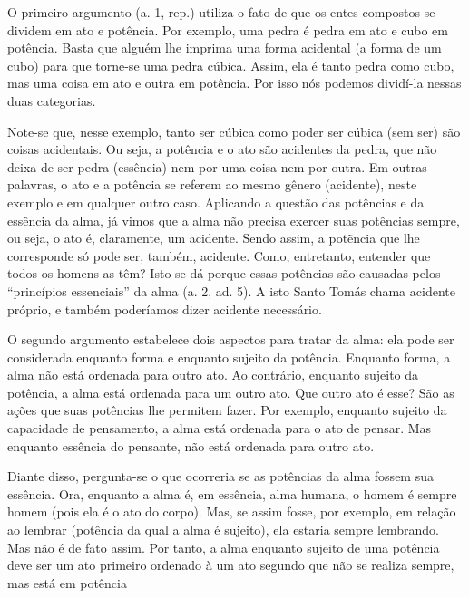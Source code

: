 \documentclass[
	article,			%
	12pt,				%
	oneside,			%
	a4paper,			%
	english,			%
	brazil,				%
	sumario=tradicional,
	doublespacing
	]{abntex2}
\begin{document}
O primeiro argumento (a. 1, rep.) utiliza o fato de que os entes compostos se dividem em ato e potência. Por exemplo, uma pedra é pedra em ato e cubo em potência. Basta que alguém lhe imprima uma forma acidental (a forma de um cubo) para que torne-se uma pedra cúbica. Assim, ela é tanto pedra como cubo, mas uma coisa em ato e outra em potência. Por isso nós podemos dividí-la nessas duas categorias.

Note-se que, nesse exemplo, tanto ser cúbica como poder ser cúbica (sem ser) são coisas acidentais. Ou seja, a potência e o ato são acidentes da pedra, que não deixa de ser pedra (essência) nem por uma coisa nem por outra. Em outras palavras, o ato e a potência se referem ao mesmo gênero (acidente), neste exemplo e em qualquer outro caso.
Aplicando a questão das potências e da essência da alma\label{potenciasEEssenscia}, já vimos que a alma não precisa exercer suas potências sempre, ou seja, o ato é, claramente, um acidente. Sendo assim, a potẽncia que lhe corresponde só pode ser, também, acidente. Como, entretanto, entender que todos os homens as têm? Isto se dá porque essas potências são causadas pelos ``princípios essenciais'' da alma (a. 2, ad. 5). A isto Santo Tomás chama acidente próprio, e também poderíamos dizer acidente necessário.

O segundo argumento estabelece dois aspectos para tratar da alma: ela pode ser considerada enquanto forma e enquanto sujeito da potência. Enquanto forma, a alma não está ordenada para outro ato. Ao contrário, enquanto sujeito da potência, a alma está ordenada para um outro ato. Que outro ato é esse? São as ações que suas potências lhe permitem fazer. Por exemplo, enquanto sujeito da capacidade de pensamento, a alma está ordenada para o ato de pensar. Mas enquanto essência do pensante, não está ordenada para outro ato.

Diante disso, pergunta-se o que ocorreria se as potências da alma fossem sua essência. Ora, enquanto a alma é, em essência, alma humana, o homem é sempre homem (pois ela é o ato do corpo). Mas, se assim fosse, por exemplo, em relação ao lembrar (potência da qual a alma é sujeito), ela estaria sempre lembrando. Mas não é de fato assim. Por tanto, a alma enquanto sujeito de uma potência deve ser um ato primeiro ordenado à um ato segundo que não se realiza sempre, mas está em potência 
\end{document}
